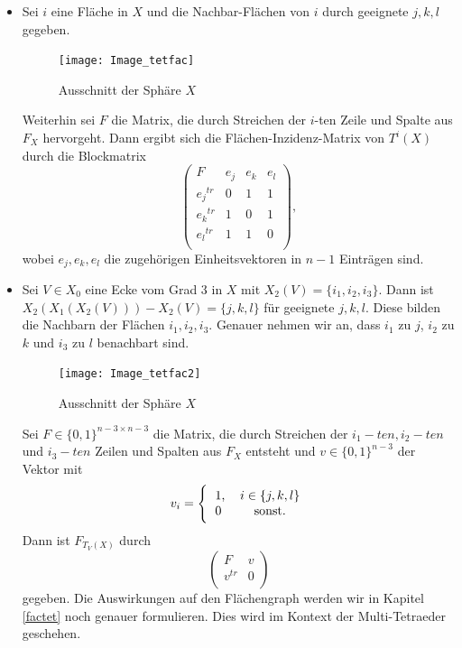 \documentclass[12pt,titlepage,twoside,cleardoublepage]{article}
\theoremstyle{nummermitklammern}
\numberwithin{equation}{section}
\begin{document}
\begin{enumerate}
\begin{itemize}  
\item Sei $i$ eine Fläche in $X$ und die Nachbar-Flächen von $i$ durch geeignete $j,k,l$ gegeben.
\begin{figure}[H]
\begin{center}
\texttt{[image: Image\_tetfac]}
\end{center}
\caption{Ausschnitt der Sphäre $X$}
\end{figure}
Weiterhin sei $F$ die Matrix, die durch Streichen der $i$-ten Zeile und Spalte aus $F_X$ hervorgeht. Dann ergibt sich die Flächen-Inzidenz-Matrix von $T^i(X)$ durch die Blockmatrix
\[
\left( 
\begin{array}{c|ccc} 
  F & e_j& e_k &e_l \\ 
  \hline 
  {e_j}^{tr} & 0 & 1 & 1  \\
  {e_k}^{tr} & 1 & 0 & 1 \\
  {e_l}^{tr} & 1 & 1 & 0 \\
\end{array} 
\right),
\]
wobei $e_j,e_k,e_l$ die zugehörigen Einheitsvektoren in $n-1$ Einträgen sind. 
\item Sei $V\in X_0$ eine Ecke vom Grad 3 in $X$ mit $X_2(V)=\{i_1,i_2,i_3\}.$ Dann ist $X_2(X_1(X_2(V)))-X_2(V)=\{j,k,l\}$ für geeignete $j,k,l$. Diese bilden die Nachbarn der Flächen $i_1,i_2,i_3.$ Genauer nehmen wir an, dass $i_1$ zu $j$, $i_2$ zu $k$ und $i_3$ zu $l$ benachbart sind.
\begin{figure}[H]
\begin{center}
\texttt{[image: Image\_tetfac2]}
\end{center}
\caption{Ausschnitt der Sphäre $X$}
\end{figure}  
Sei $F\in \{0,1\}^{n-3\times n-3}$ die Matrix, die durch Streichen der $i_1-ten,i_2-ten$ und $i_3-ten$ Zeilen und Spalten  aus $F_X$ entsteht und $v\in \{0,1\}^{n-3}$ der Vektor mit
\[
v_{i}=
\Biggl{\{\begin{tabular}[l]{lcr}
1,&\textcolor{black}{$i\in \{j,k,l\}$} \\
0& sonst.\\
\end{tabular}}
\] Dann ist $F_{T_V(X)}$ durch 
\[
\left( 
\begin{array}{c|ccc} 
  F & v \\ 
  \hline 
  {v}^{tr} & 0\\
\end{array} 
\right)
\]
gegeben.
Die Auswirkungen auf den Flächengraph werden wir in Kapitel  \ref{factet} noch genauer formulieren. Dies wird im Kontext der Multi-Tetraeder geschehen.
\end{itemize}
\end{enumerate}
\newpage
\end{document}
